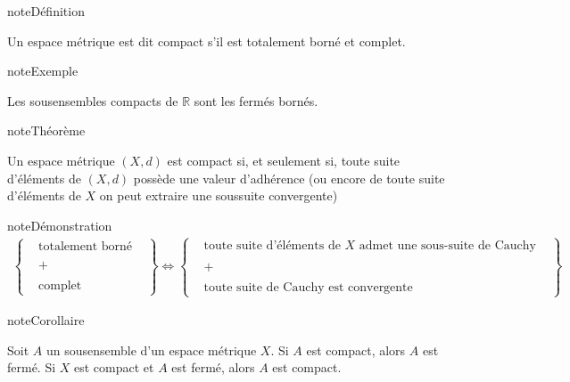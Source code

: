 \documentclass[letterpaper,10pt,french]{sphinxmanual}
\begin{document}
\begin{sphinxadmonition}{note}{Définition}

\sphinxAtStartPar
Un espace métrique est dit compact s’il est totalement borné et complet.
\end{sphinxadmonition}

\begin{sphinxadmonition}{note}{Exemple}

\sphinxAtStartPar
Les sous\sphinxhyphen{}ensembles compacts de \(\mathbb R\) sont les fermés bornés.
\end{sphinxadmonition}

\begin{sphinxadmonition}{note}{Théorème}

\sphinxAtStartPar
Un espace métrique \((X, d)\) est compact si, et seulement si, toute suite d’éléments de \((X, d)\) possède une valeur d’adhérence (ou encore de toute suite d’éléments de \(X\) on peut extraire une sous\sphinxhyphen{}suite convergente)
\end{sphinxadmonition}

\begin{sphinxadmonition}{note}{Démonstration}
\begin{equation*}
\begin{split}
\left\{
\begin{aligned}
&\mbox{totalement borné}&\\ \\
&+& \\ \\
&\mbox{complet}&
\end{aligned}
\right\} \Leftrightarrow \left\{
\begin{aligned}
&\mbox{toute suite d'éléments de $X$ admet une sous-suite de Cauchy}&\\ \\
&+& \\ \\
&\mbox{toute suite de Cauchy est convergente}&
\end{aligned}
\right\}
\end{split}
\end{equation*}\end{sphinxadmonition}

\begin{sphinxadmonition}{note}{Corollaire}

\sphinxAtStartPar
Soit \(A\) un sous\sphinxhyphen{}ensemble d’un espace métrique \(X\). Si \(A\) est compact, alors \(A\) est fermé. Si \(X\) est compact et \(A\) est fermé, alors \(A\) est compact.
\end{sphinxadmonition}
\end{document}
